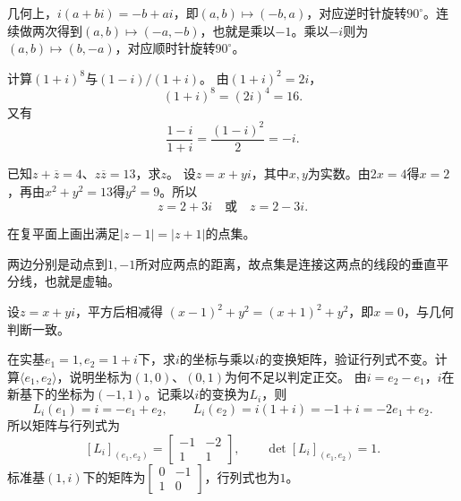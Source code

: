 几何上，\(i(a+bi)=-b+ai\)，即\((a,b)\mapsto(-b,a)\)，对应逆时针旋转\(90^\circ\)。连续做两次得到\((a,b)\mapsto(-a,-b)\)，也就是乘以\(-1\)。乘以\(-i\)则为\((a,b)\mapsto(b,-a)\)，对应顺时针旋转\(90^\circ\)。


计算\((1+i)^8\)与\((1-i)/(1+i)\)。
\solutionanswer
由\((1+i)^2=2i\)，
\[
(1+i)^8=(2i)^4=16.
\]
又有
\[
\frac{1-i}{1+i}=\frac{(1-i)^2}{2}=-i.
\]


已知\(z+\overline z=4\)、\(z\overline z=13\)，求\(z\)。
\solutionanswer
设\(z=x+yi\)，其中\(x,y\)为实数。由\(2x=4\)得\(x=2\)，再由\(x^2+y^2=13\)得\(y^2=9\)。所以
\[
z=2+3i\quad\text{或}\quad z=2-3i.
\]


在复平面上画出满足\(|z-1|=|z+1|\)的点集。
\solutionanswer
\par\noindent
\begin{minipage}[c]{.68\linewidth}
\setlength{\parindent}{2em}
两边分别是动点到\(1,-1\)所对应两点的距离，故点集是连接这两点的线段的垂直平分线，也就是虚轴。

设\(z=x+yi\)，平方后相减得
\((x-1)^2+y^2=(x+1)^2+y^2\)，即\(x=0\)，与几何判断一致。
\end{minipage}\hfill
\begin{minipage}[c]{.29\linewidth}
\centering
{}
\end{minipage}\par


在实基\(e_1=1,e_2=1+i\)下，求\(i\)的坐标与乘以\(i\)的变换矩阵，验证行列式不变。计算\(\langle e_1,e_2\rangle\)，说明坐标为\((1,0)\)、\((0,1)\)为何不足以判定正交。
\solutionanswer
由\(i=e_2-e_1\)，\(i\)在新基下的坐标为\((-1,1)\)。记乘以\(i\)的变换为\(L_i\)，则
\[
L_i(e_1)=i=-e_1+e_2,\qquad
L_i(e_2)=i(1+i)=-1+i=-2e_1+e_2.
\]
所以矩阵与行列式为
\[
[L_i]_{(e_1,e_2)}=
\begin{bmatrix}-1&-2\\1&1\end{bmatrix},
\qquad \det[L_i]_{(e_1,e_2)}=1.
\]
标准基\((1,i)\)下的矩阵为\(\begin{bmatrix}0&-1\\1&0\end{bmatrix}\)，行列式也为\(1\)。

